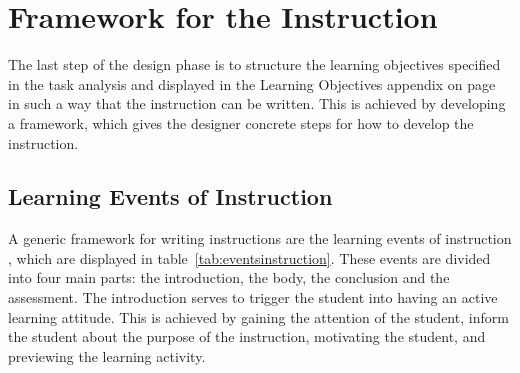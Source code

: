 \documentclass[11pt,twoside]{report} %
\begin{document}
\section{Framework for the Instruction}

The last step of the design phase is to structure the learning objectives specified in the task analysis and displayed in the Learning Objectives appendix on page~\pageref{app:learningobjectives} in such a way that the instruction can be written. This is achieved by developing a framework, which gives the designer concrete steps for how to develop the instruction.

\subsection{Learning Events of Instruction}

A generic framework for writing instructions are the learning events of instruction \cite{smithragan}, which are displayed in table~\ref{tab:eventsinstruction}. These events are divided into four main parts: the introduction, the body, the conclusion and the assessment. The introduction serves to trigger the student into having an active learning attitude. This is achieved by gaining the attention of the student, inform the student about the purpose of the instruction, motivating the student, and previewing the learning activity.
\end{document}
